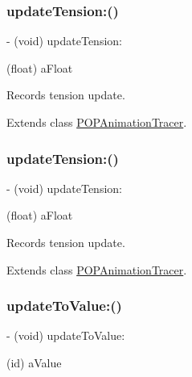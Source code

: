 \subsubsection{\texorpdfstring{update\+Tension\+:()}{updateTension:()}\hspace{0.1cm}{\footnotesize\ttfamily [1/2]}}
{\footnotesize\ttfamily -\/ (void) update\+Tension\+: \begin{DoxyParamCaption}\item[{(float)}]{a\+Float }\end{DoxyParamCaption}}

Records tension update. 

Extends class \mbox{\hyperlink{interface_p_o_p_animation_tracer_a5010bbc6fa2ec5426d33706651e584de}{P\+O\+P\+Animation\+Tracer}}.

\mbox{\label{category_p_o_p_animation_tracer_07_internal_08_a5010bbc6fa2ec5426d33706651e584de}} 
\subsubsection{\texorpdfstring{update\+Tension\+:()}{updateTension:()}\hspace{0.1cm}{\footnotesize\ttfamily [2/2]}}
{\footnotesize\ttfamily -\/ (void) update\+Tension\+: \begin{DoxyParamCaption}\item[{(float)}]{a\+Float }\end{DoxyParamCaption}}

Records tension update. 

Extends class \mbox{\hyperlink{interface_p_o_p_animation_tracer_a5010bbc6fa2ec5426d33706651e584de}{P\+O\+P\+Animation\+Tracer}}.

\mbox{\label{category_p_o_p_animation_tracer_07_internal_08_a00d4c0e1b6b446081cfb6c153f37a633}} 
\subsubsection{\texorpdfstring{update\+To\+Value\+:()}{updateToValue:()}\hspace{0.1cm}{\footnotesize\ttfamily [1/2]}}
{\footnotesize\ttfamily -\/ (void) update\+To\+Value\+: \begin{DoxyParamCaption}\item[{(id)}]{a\+Value }\end{DoxyParamCaption}}

